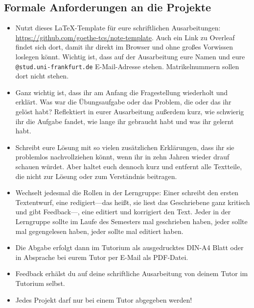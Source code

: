 \documentclass{uebung_cs}
\begin{document}
\subsection*{Formale Anforderungen an die Projekte}
\begin{itemize}
  \item
  Nutzt dieses LaTeX-Template für eure schriftlichen Ausarbeitungen: \url{https://github.com/goethe-tcs/note-template}. Auch ein Link zu Overleaf findet sich dort, damit ihr direkt im Browser und ohne großes Vorwissen loslegen könnt.
  Wichtig ist, dass auf der Ausarbeitung eure Namen und eure \texttt{@stud.uni-frankfurt.de} E-Mail-Adresse stehen.
  Matrikelnummern sollen dort nicht stehen.
  \item
  Ganz wichtig ist, dass ihr am Anfang die Fragestellung wiederholt und erklärt. Was war die Übungsaufgabe oder das Problem, die oder das ihr gelöst habt?
  Reflektiert in eurer Ausarbeitung außerdem kurz, wie schwierig ihr die Aufgabe fandet, wie lange ihr gebraucht habt und was ihr gelernt habt.
  \item
  Schreibt eure Lösung mit so vielen zusätzlichen Erklärungen, dass ihr sie problemlos nachvollziehen könnt, wenn ihr in zehn Jahren wieder drauf schauen würdet.
  Aber haltet euch dennoch kurz und entfernt alle Textteile, die nicht zur Lösung oder zum Verständnis beitragen.
  \item
  Wechselt jedesmal die Rollen in der Lerngruppe: Einer schreibt den ersten Textentwurf, eine redigiert---das heißt, sie liest das Geschriebene ganz kritisch und gibt Feedback---, eine editiert und korrigiert den Text. Jeder in der Lerngruppe sollte im Laufe des Semesters mal geschrieben haben, jeder sollte mal gegengelesen haben, jeder sollte mal editiert haben.
  \item
  Die Abgabe erfolgt dann im Tutorium als ausgedrucktes DIN-A4 Blatt oder in Absprache bei eurem Tutor per E-Mail als PDF-Datei.
  \item
  Feedback erhälst du auf deine schriftliche Ausarbeitung von deinem Tutor im Tutorium selbst.
  \item
  Jedes Projekt darf nur bei einem Tutor abgegeben werden!
\end{itemize}
\end{document}
